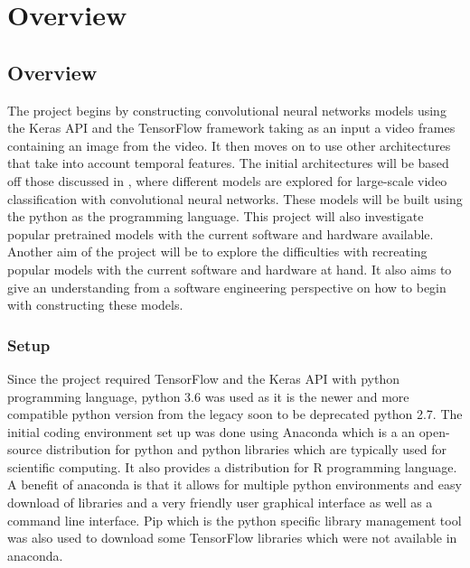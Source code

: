 \chapter{Overview}
\label{chapterlabel2}
\section{Overview}
The project begins by constructing convolutional neural networks models using the Keras API and the TensorFlow framework taking as an input a video frames containing an image from the video.
It then moves on to use other architectures that take into account temporal features.
The initial architectures will be based off those discussed in \citep{KarpathyCVPR14}, where different models are explored for large-scale video classification with convolutional neural networks.
These models will be built using the python as the programming language.
This project will also investigate popular pretrained models with the current software and hardware available.
Another aim of the project will be to explore the difficulties with recreating popular models with the current software and hardware at hand.
It also aims to give an understanding from a software engineering perspective on how to begin with constructing these models.



\subsection{Setup}
Since the project required TensorFlow and the Keras API with python programming language, python 3.6 was used as it is the newer and more compatible python version from the legacy soon to be deprecated python 2.7.
The initial coding environment set up was done using Anaconda which is a an open-source distribution for python and python libraries which are typically used for scientific computing.
It also provides a distribution for R programming language.
A benefit of anaconda is that it allows for multiple python environments and easy download of libraries and a very friendly user graphical interface as well as a command line interface.
Pip which is the python specific library management tool was also used to download some TensorFlow libraries which were not available in anaconda.

